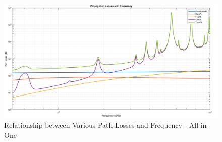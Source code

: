 \documentclass[a4paper,11pt]{article}%
\begin{document}
\begin{figure}[!h]
	\centering
	\includegraphics[scale=0.35]{figures/AllinOne.png}
	\caption{Relationship between Various Path Losses and Frequency - All in One}
\end{figure}
%
%
%
%
%
\end{document}
